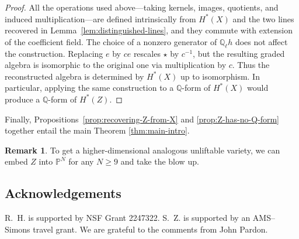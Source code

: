 \documentclass[11pt, reqno]{amsart}
\theoremstyle{definition}
\newtheorem{remark}[theorem]{Remark}
\newcommand\QQ{\mathbb{Q}}
\begin{document}
\begin{proof}
All the operations used above—taking kernels, images, quotients, and
induced multiplication—are defined intrinsically from $H^*(X)$ and the
two lines recovered in Lemma~\ref{lem:distinguished-lines}, and they
commute with extension of the coefficient field.  The choice of a
nonzero generator of $\QQ_\ell h$ does not affect the construction.
Replacing $e$ by $ce$ rescales $\star$ by $c^{-1}$, but the resulting
graded algebra is isomorphic to the original one via multiplication by
$c$.  Thus the reconstructed algebra is determined by $H^*(X)$ up to
isomorphism.  In particular, applying the same construction to a
$\QQ$-form of $H^*(X)$ would produce a $\QQ$-form of $H^*(Z)$.
\end{proof}

Finally, Propositions~\ref{prop:recovering-Z-from-X} and \ref{prop:Z-has-no-Q-form} together entail the main Theorem \ref{thm:main-intro}.

\begin{remark}
    To get a higher-dimensional analogous unliftable variety, we can embed $Z$ into $\mathbb{P}^N$ for any $N\geq 9$ and take the blow up.
\end{remark}


\subsection*{Acknowledgements}\;

R.~H. is supported by 
NSF Grant 2247322.
S.~Z. is supported by an AMS--Simons travel grant. We are grateful to the comments from John Pardon.










\end{document}
